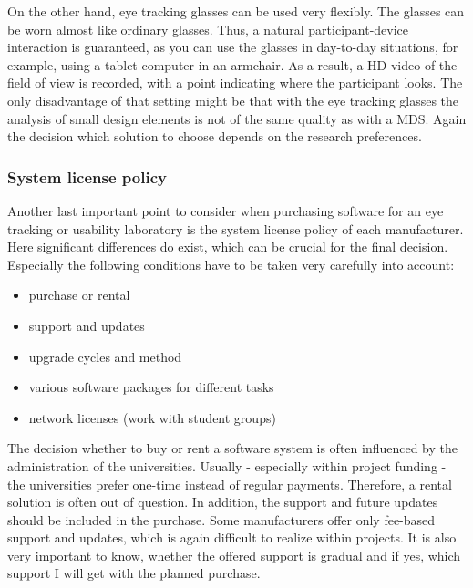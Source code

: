 \begin{
}[h]
\begin{styleBodyTextIndent}
On the other hand, eye tracking glasses can be used very flexibly. The glasses can be worn almost like ordinary glasses. Thus, a natural participant-device interaction is guaranteed, as you can use the glasses in day-to-day situations, for example, using a tablet computer in an armchair. As a result, a HD video of the field of view is recorded, with a point indicating where the participant looks. The only disadvantage of that setting might be that with the eye tracking glasses the analysis of small design elements is not of the same quality as with a MDS. Again the decision which solution to choose depends on the research preferences.
\end{styleBodyTextIndent}

\subsubsection{System license policy}

Another last important point to consider when purchasing software for an eye tracking or usability laboratory is the system license policy of each manufacturer. Here significant differences do exist, which can be crucial for the final decision. Especially the following conditions have to be taken very carefully into account:

\begin{itemize}
\item purchase or rental 
\item support and updates 
\item upgrade cycles and method 
\item various software packages for different tasks 
\item network licenses (work with student groups)
\end{itemize}


The decision whether to buy or rent a software system is often influenced by the administration of the universities. Usually - especially within project funding - the universities prefer one-time instead of regular payments. Therefore, a rental solution is often out of question. In addition, the support and future updates should be included in the purchase. Some manufacturers offer only fee-based support and updates, which is again difficult to realize within projects. It is also very important to know, whether the offered support is gradual and if yes, which support I will get with the planned purchase.


\end{
}
